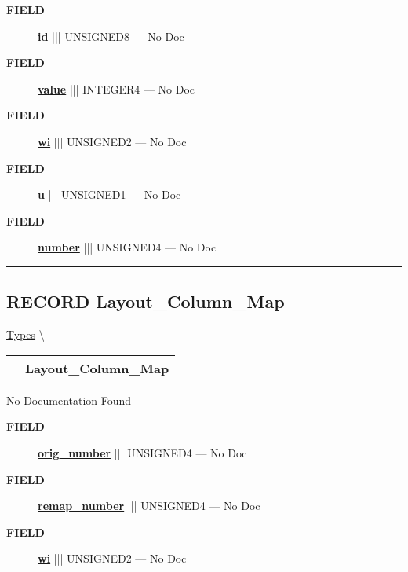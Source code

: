 \par
\begin{description}
\item [\colorbox{tagtype}{\color{white} \textbf{\textsf{FIELD}}}] \textbf{\underline{id}} ||| UNSIGNED8 --- No Doc
\item [\colorbox{tagtype}{\color{white} \textbf{\textsf{FIELD}}}] \textbf{\underline{value}} ||| INTEGER4 --- No Doc
\item [\colorbox{tagtype}{\color{white} \textbf{\textsf{FIELD}}}] \textbf{\underline{wi}} ||| UNSIGNED2 --- No Doc
\item [\colorbox{tagtype}{\color{white} \textbf{\textsf{FIELD}}}] \textbf{\underline{u}} ||| UNSIGNED1 --- No Doc
\item [\colorbox{tagtype}{\color{white} \textbf{\textsf{FIELD}}}] \textbf{\underline{number}} ||| UNSIGNED4 --- No Doc
\end{description}





\rule{\linewidth}{0.5pt}
\subsection*{\textsf{\colorbox{headtoc}{\color{white} RECORD}
Layout\_Column\_Map}}

\hypertarget{ecldoc:logisticregression.types.layout_column_map}{}
\hspace{0pt} \hyperlink{ecldoc:LogisticRegression.Types}{Types} \textbackslash 

{\renewcommand{\arraystretch}{1.5}
\begin{tabularx}{\textwidth}{|>{\raggedright\arraybackslash}l|X|}
\hline
\hspace{0pt}\mytexttt{\color{red} } & \textbf{Layout\_Column\_Map} \\
\hline
\end{tabularx}
}

\par





No Documentation Found







\par
\begin{description}
\item [\colorbox{tagtype}{\color{white} \textbf{\textsf{FIELD}}}] \textbf{\underline{orig\_number}} ||| UNSIGNED4 --- No Doc
\item [\colorbox{tagtype}{\color{white} \textbf{\textsf{FIELD}}}] \textbf{\underline{remap\_number}} ||| UNSIGNED4 --- No Doc
\item [\colorbox{tagtype}{\color{white} \textbf{\textsf{FIELD}}}] \textbf{\underline{wi}} ||| UNSIGNED2 --- No Doc
\end{description}





